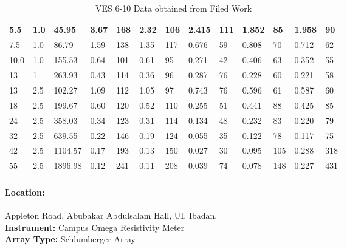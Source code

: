 \documentclass[12pt,a4paper]{report}
\begin{document}
\begin{table}[h!]
\begin{adjustbox}{max width=\textwidth}
\begin{tabular}{|p{2.5cm}|p{2.5cm}|p{2.5cm}|p{1.5cm}|p{1.8cm}|p{1.5cm}|p{1.8cm}|p{1.5cm}|p{1.8cm}|p{1.5cm}|p{1.8cm}|p{1.5cm}|p{1.8cm}|}
    5.5 & 1.0 & 45.95 & 3.67 & 168 & 2.32 & 106 & 2.415 & 111 & 1.852 & 85 & 1.958 & 90 \\ \hline
    7.5 & 1.0 & 86.79 & 1.59 & 138 & 1.35 & 117 & 0.676 & 59 & 0.808 & 70 & 0.712 & 62 \\ \hline
    10.0 & 1.0 & 155.53 & 0.64 & 101 & 0.61 & 95 & 0.271 & 42 & 0.406 & 63 & 0.352 & 55 \\ \hline
    13 & 1 & 263.93 & 0.43 & 114 & 0.36 & 96 & 0.287 & 76 & 0.228 & 60 & 0.221 & 58 \\ \hline
    13 & 2.5 & 102.27 & 1.09 & 112 & 1.05 & 97 & 0.743 & 76 & 0.596 & 61 & 0.587 & 60 \\ \hline
    18 & 2.5 & 199.67 & 0.60 & 120 & 0.52 & 110 & 0.255 & 51 & 0.441 & 88 & 0.425 & 85 \\ \hline
    24 & 2.5 & 358.03 & 0.34 & 123 & 0.31 & 114 & 0.134 & 48 & 0.232 & 83 & 0.220 & 79 \\ \hline
    32 & 2.5 & 639.55 & 0.22 & 146 & 0.19 & 124 & 0.055 & 35 & 0.122 & 78 & 0.117 & 75 \\ \hline
    42 & 2.5 & 1104.57 & 0.17 & 193 & 0.13 & 150 & 0.027 & 30 & 0.095 & 105 & 0.288 & 318 \\ \hline
    55 & 2.5 & 1896.98 & 0.12 & 241 & 0.11 & 208 & 0.039 & 74 & 0.078 & 148 & 0.227 & 431 \\ \hline
    \end{tabular}
    \end{adjustbox}
    \caption{VES 6-10 Data obtained from Filed Work}
    \label{tab:ui_ves-6-10}
\end{table}

\paragraph{\textbf{Location:}} {Appleton Road, Abubakar Abdulsalam Hall, UI, Ibadan.} \\
\textbf{Instrument:} {Campus Omega Resistivity Meter} \\
\textbf{Array Type:} {Schlumberger Array }
\end{document}
